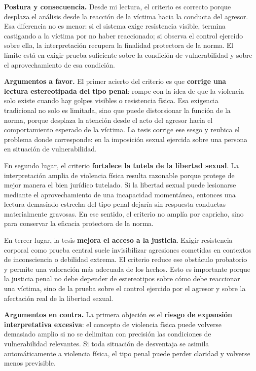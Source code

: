 \documentclass[
	spanish,
	letterpaper, oneside
]{article}
\begin{document}
\textbf{Postura y consecuencia.} Desde mi lectura, el criterio es correcto porque desplaza el análisis desde la reacción de la víctima hacia la conducta del agresor. Esa diferencia no es menor: si el sistema exige resistencia visible, termina castigando a la víctima por no haber reaccionado; si observa el control ejercido sobre ella, la interpretación recupera la finalidad protectora de la norma. El límite está en exigir prueba suficiente sobre la condición de vulnerabilidad y sobre el aprovechamiento de esa condición.

\textbf{Argumentos a favor.} El primer acierto del criterio es que \textbf{corrige una lectura estereotipada del tipo penal}: rompe con la idea de que la violencia solo existe cuando hay golpes visibles o resistencia física. Esa exigencia tradicional no solo es limitada, sino que puede distorsionar la función de la norma, porque desplaza la atención desde el acto del agresor hacia el comportamiento esperado de la víctima. La tesis corrige ese sesgo y reubica el problema donde corresponde: en la imposición sexual ejercida sobre una persona en situación de vulnerabilidad.

En segundo lugar, el criterio \textbf{fortalece la tutela de la libertad sexual}. La interpretación amplia de violencia física resulta razonable porque protege de mejor manera el bien jurídico tutelado. Si la libertad sexual puede lesionarse mediante el aprovechamiento de una incapacidad momentánea, entonces una lectura demasiado estrecha del tipo penal dejaría sin respuesta conductas materialmente gravosas. En ese sentido, el criterio no amplía por capricho, sino para conservar la eficacia protectora de la norma.

En tercer lugar, la tesis \textbf{mejora el acceso a la justicia}. Exigir resistencia corporal como prueba central suele invisibilizar agresiones cometidas en contextos de inconsciencia o debilidad extrema. El criterio reduce ese obstáculo probatorio y permite una valoración más adecuada de los hechos. Esto es importante porque la justicia penal no debe depender de estereotipos sobre cómo debe reaccionar una víctima, sino de la prueba sobre el control ejercido por el agresor y sobre la afectación real de la libertad sexual.

\textbf{Argumentos en contra.} La primera objeción es el \textbf{riesgo de expansión interpretativa excesiva}: el concepto de violencia física puede volverse demasiado amplio si no se delimitan con precisión las condiciones de vulnerabilidad relevantes. Si toda situación de desventaja se asimila automáticamente a violencia física, el tipo penal puede perder claridad y volverse menos previsible.
\end{document}
